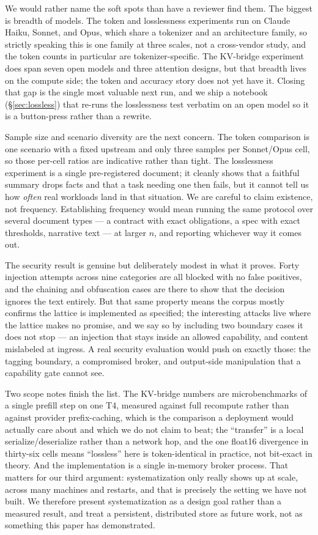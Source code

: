 \documentclass[11pt]{article}
\begin{document}
We would rather name the soft spots than have a reviewer find them. The biggest is breadth of models.
The token and losslessness experiments run on Claude Haiku, Sonnet, and Opus, which share a tokenizer
and an architecture family, so strictly speaking this is one family at three scales, not a cross-vendor
study, and the token counts in particular are tokenizer-specific. The KV-bridge experiment does span
seven open models and three attention designs, but that breadth lives on the compute side; the token
and accuracy story does not yet have it. Closing that gap is the single most valuable next run, and we
ship a notebook (\S\ref{sec:lossless}) that re-runs the losslessness test verbatim on an open model so
it is a button-press rather than a rewrite.

Sample size and scenario diversity are the next concern. The token comparison is one scenario with a
fixed upstream and only three samples per Sonnet/Opus cell, so those per-cell ratios are indicative
rather than tight. The losslessness experiment is a single pre-registered document; it cleanly shows
that a faithful summary drops facts and that a task needing one then fails, but it cannot tell us how
\emph{often} real workloads land in that situation. We are careful to claim existence, not frequency.
Establishing frequency would mean running the same protocol over several document types --- a contract
with exact obligations, a spec with exact thresholds, narrative text --- at larger $n$, and reporting
whichever way it comes out.

The security result is genuine but deliberately modest in what it proves. Forty injection attempts
across nine categories are all blocked with no false positives, and the chaining and obfuscation cases
are there to show that the decision ignores the text entirely. But that same property means the corpus
mostly confirms the lattice is implemented as specified; the interesting attacks live where the lattice
makes no promise, and we say so by including two boundary cases it does not stop --- an injection that
stays inside an allowed capability, and content mislabeled at ingress. A real security evaluation would
push on exactly those: the tagging boundary, a compromised broker, and output-side manipulation that a
capability gate cannot see.

Two scope notes finish the list. The KV-bridge numbers are microbenchmarks of a single prefill step on
one T4, measured against full recompute rather than against provider prefix-caching, which is the
comparison a deployment would actually care about and which we do not claim to beat; the ``transfer''
is a local serialize/deserialize rather than a network hop, and the one float16 divergence in
thirty-six cells means ``lossless'' here is token-identical in practice, not bit-exact in theory. And
the implementation is a single in-memory broker process. That matters for our third argument:
systematization only really shows up at scale, across many machines and restarts, and that is precisely
the setting we have not built. We therefore present systematization as a design goal rather than a
measured result, and treat a persistent, distributed store as future work, not as something this paper
has demonstrated.
\end{document}
